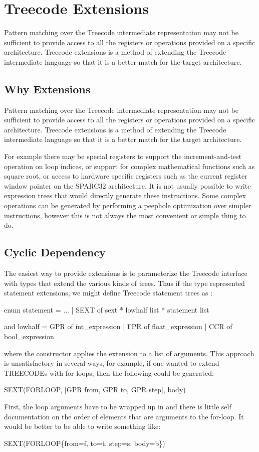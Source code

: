 \section{Treecode Extensions} \label{sec:treecode-extension}
	Pattern matching over the Treecode intermediate representation
may not be sufficient to provide access to all the registers or
operations provided on a specific architecture. Treecode extensions is a 
method of extending the Treecode intermediate language so that it is a
better match for the target architecture.


\subsection{Why Extensions}

	Pattern matching over the Treecode intermediate representation
may not be sufficient to provide access to all the registers or
operations provided on a specific architecture. Treecode extensions is a 
method of extending the Treecode intermediate language so that it is a
better match for the target architecture.

For example there may be special registers to support the
increment-and-test operation on loop indices, or 
support for complex mathematical functions such as
square root, or access to hardware specific registers such as the
current register window pointer on the SPARC32 architecture. It is not
usually possible to write expression trees that would directly
generate these instructions.
Some complex operations can be generated by performing a peephole
optimization over simpler instructions, however this is not always the 
most convenient or simple thing to do.

\subsection{Cyclic Dependency}

The easiest way to provide extensions is to parameterize the Treecode
interface with types that extend the various kinds of trees. Thus if
the type  represented statement extensions, we might define
Treecode statement trees as :
\begin{SML}
  enum statement
    = ...
    | SEXT of sext * lowhalf list * statement list

  and lowhalf = GPR of int_expression | FPR of float_expression | CCR of bool_expression
\end{SML}
where the constructor  applies the extension to a list of
arguments. This approach is unsatisfactory in several ways, for
example, if one wanted to extend TREECODEs with for-loops, then the
following could be generated:
\begin{SML}
  SEXT(FORLOOP, [GPR from, GPR to, GPR step], body)
\end{SML}	
First, the loop arguments have to be wrapped up in  and there
is little self documentation on the order of elements that are
arguments to the for-loop. It would be better to be able to write
something like:
\begin{SML}
  SEXT(FORLOOP\{from=f, to=t, step=s, body=b\}) 
\end{SML}

